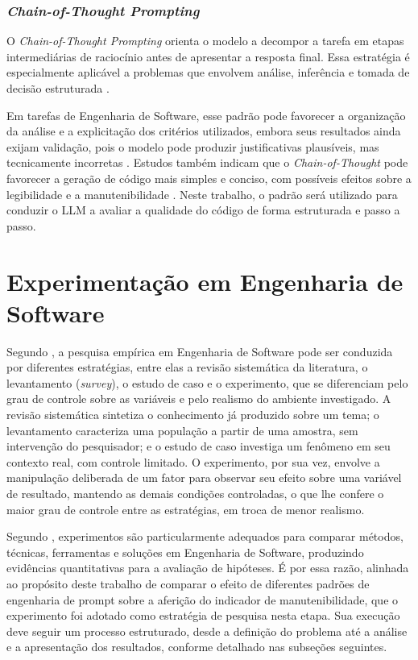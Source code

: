 \subsubsection{\textit{Chain-of-Thought Prompting}}

O \textit{Chain-of-Thought Prompting} orienta o modelo a decompor a tarefa em etapas intermediárias de raciocínio antes de apresentar a resposta final. Essa estratégia é especialmente aplicável a problemas que envolvem análise, inferência e tomada de decisão estruturada \cite{alomari2026}.

Em tarefas de Engenharia de Software, esse padrão pode favorecer a organização da análise e a explicitação dos critérios utilizados, embora seus resultados ainda exijam validação, pois o modelo pode produzir justificativas plausíveis, mas tecnicamente incorretas \cite{OuedraogoEtAll}. Estudos também indicam que o \textit{Chain-of-Thought} pode favorecer a geração de código mais simples e conciso, com possíveis efeitos sobre a legibilidade e a manutenibilidade \cite{DellaPortaEtAll}. Neste trabalho, o padrão será utilizado para conduzir o LLM a avaliar a qualidade do código de forma estruturada e passo a passo.

\section{Experimentação em Engenharia de Software}

Segundo , a pesquisa empírica em Engenharia de Software pode ser conduzida por diferentes estratégias, entre elas a revisão sistemática da literatura, o levantamento (\textit{survey}), o estudo de caso e o experimento, que se diferenciam pelo grau de controle sobre as variáveis e pelo realismo do ambiente investigado. A revisão sistemática sintetiza o conhecimento já produzido sobre um tema; o levantamento caracteriza uma população a partir de uma amostra, sem intervenção do pesquisador; e o estudo de caso investiga um fenômeno em seu contexto real, com controle limitado. O experimento, por sua vez, envolve a manipulação deliberada de um fator para observar seu efeito sobre uma variável de resultado, mantendo as demais condições controladas, o que lhe confere o maior grau de controle entre as estratégias, em troca de menor realismo.

Segundo , experimentos são particularmente adequados para comparar métodos, técnicas, ferramentas e soluções em Engenharia de Software, produzindo evidências quantitativas para a avaliação de hipóteses. É por essa razão, alinhada ao propósito deste trabalho de comparar o efeito de diferentes padrões de engenharia de prompt sobre a aferição do indicador de manutenibilidade, que o experimento foi adotado como estratégia de pesquisa nesta etapa. Sua execução deve seguir um processo estruturado, desde a definição do problema até a análise e a apresentação dos resultados, conforme detalhado nas subseções seguintes.

